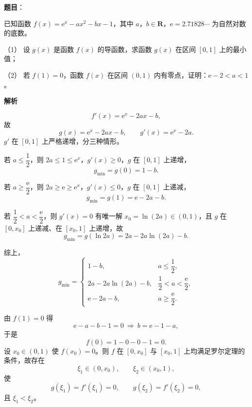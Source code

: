 \begin{answer}


\end{answer}
\begin{answer}

\textbf{题目}：

已知函数 $f(x)=\mathrm e^x-ax^2-bx-1$，其中 $a$，$b\in\mathbf R$，$\mathrm e=2.71828\cdots$ 为自然对数的底数。

（1） 设 $g(x)$ 是函数 $f(x)$ 的导函数，求函数 $g(x)$ 在区间 $[0,1]$ 上的最小值；

（2） 若 $f(1)=0$，函数 $f(x)$ 在区间 $(0,1)$ 内有零点，证明：$\mathrm e-2<a<1$。

\textbf{解析}


\nopagebreak[4]
\[f'(x)=\mathrm e^x-2ax-b,\]
故
\nopagebreak[4]
\[g(x)=\mathrm e^x-2ax-b,\qquad g'(x)=\mathrm e^x-2a .\]
$g'$ 在 $[0,1]$ 上严格递增，分三种情形。

若 $a\leqslant\dfrac12$，则 $2a\leqslant1\leqslant\mathrm e^x$，$g'(x)\geqslant0$，$g$ 在 $[0,1]$ 上递增，
\nopagebreak[4]
\[g_{\min}=g(0)=1-b .\]

若 $a\geqslant\dfrac{\mathrm e}2$，则 $2a\geqslant\mathrm e\geqslant\mathrm e^x$，$g'(x)\leqslant0$，$g$ 在 $[0,1]$ 上递减，
\nopagebreak[4]
\[g_{\min}=g(1)=\mathrm e-2a-b .\]

若 $\dfrac12<a<\dfrac{\mathrm e}2$，则 $g'(x)=0$ 有唯一解 $x_0=\ln(2a)\in(0,1)$，且 $g$ 在 $[0,x_0]$ 上递减、在 $[x_0,1]$ 上递增，故
\nopagebreak[4]
\[g_{\min}=g(\ln 2a)=2a-2a\ln(2a)-b .\]

综上，
\nopagebreak[4]
\[g_{\min}=\begin{cases}
1-b,&a\leqslant\dfrac12,\\[4pt]
2a-2a\ln(2a)-b,&\dfrac12<a<\dfrac{\mathrm e}2,\\[4pt]
\mathrm e-2a-b,&a\geqslant\dfrac{\mathrm e}2 .
\end{cases}\]


由 $f(1)=0$ 得
\nopagebreak[4]
\[\mathrm e-a-b-1=0\ \Longrightarrow\ b=\mathrm e-1-a,\]
于是
\nopagebreak[4]
\[f(0)=1-0-0-1=0 .\]
设 $x_0\in(0,1)$ 使 $f(x_0)=0$。则 $f$ 在 $[0,x_0]$ 与 $[x_0,1]$ 上均满足罗尔定理的条件，故存在
\nopagebreak[4]
\[\xi_1\in(0,x_0),\qquad \xi_2\in(x_0,1),\]
使
\nopagebreak[4]
\[g(\xi_1)=f'(\xi_1)=0,\qquad g(\xi_2)=f'(\xi_2)=0,\]
且 $\xi_1<\xi_2$。


\end{answer}
